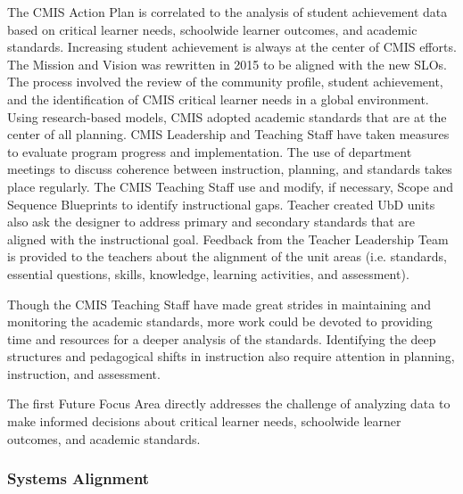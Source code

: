 
\begin{findings}
The CMIS Action Plan is correlated to the analysis of student achievement data based on critical learner needs, schoolwide learner outcomes, and academic standards.
Increasing student achievement is always at the center of CMIS efforts. The Mission and Vision was rewritten in 2015 to be aligned with the new SLOs. The process involved the review of the community profile, student achievement, and the identification of CMIS critical learner needs in a global environment.
Using research-based models, CMIS adopted academic standards that are at the center of all planning. CMIS Leadership and Teaching Staff have taken measures to evaluate program progress and implementation. The use of department meetings to discuss coherence between instruction, planning, and standards takes place regularly. The CMIS Teaching Staff use and modify, if necessary, Scope and Sequence Blueprints to identify instructional gaps. Teacher created UbD units also ask the designer to address primary and secondary standards that are aligned with the instructional goal. Feedback from the Teacher Leadership Team is provided to the teachers about the alignment of the unit areas (i.e. standards, essential questions, skills, knowledge, learning activities, and assessment). 


Though the CMIS Teaching Staff have made great strides in maintaining and monitoring the academic standards, more work could be devoted to providing time and resources for a deeper analysis of the standards. Identifying the deep structures and pedagogical shifts in instruction also require attention in planning, instruction, and assessment.  

The first Future Focus Area directly addresses the challenge of analyzing data to make informed decisions about critical learner needs, schoolwide learner outcomes, and academic standards. 
\end{findings}

\subsubsection{Systems Alignment}


